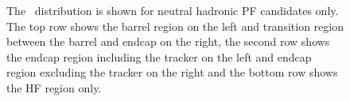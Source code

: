 \begin{figure}[!ht]
\begin{center}
\caption{The \MET\ distribution is shown for neutral hadronic PF candidates only.
The top row shows the barrel region on the left and transition region between the barrel and endcap on the right,
the second row shows the endcap region including the tracker on the left and endcap region excluding the tracker on the right
and the bottom row shows the HF region only.
\label{fig:nupfcands}
}
\end{center}
\end{figure}

\clearpage
